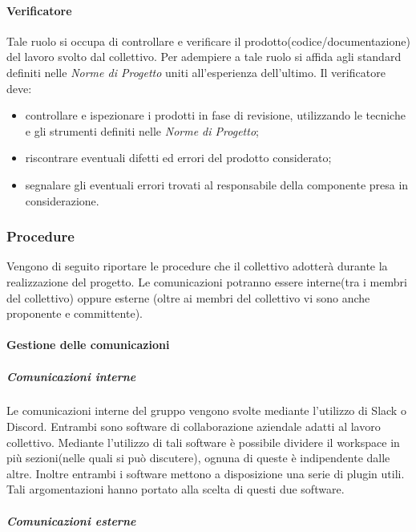 			\paragraph{Verificatore}
			Tale ruolo si occupa di controllare e verificare il prodotto(codice/documentazione) del lavoro svolto dal collettivo. Per adempiere a tale ruolo si affida agli standard definiti nelle \textit{Norme di Progetto} uniti all'esperienza dell'ultimo. Il verificatore deve:
			\begin{itemize}
				\item controllare e ispezionare i prodotti in fase di revisione, utilizzando le tecniche e gli strumenti definiti nelle \textit{Norme di Progetto};
				\item riscontrare eventuali difetti ed errori del prodotto considerato;
				\item segnalare gli eventuali errori trovati al responsabile della componente presa in considerazione.
			\end{itemize}
		
		
		\subsubsection{Procedure}
		Vengono di seguito riportare le procedure che il collettivo adotterà durante la realizzazione del progetto. Le comunicazioni potranno essere interne(tra i membri del collettivo) oppure esterne (oltre ai membri del collettivo vi sono anche proponente e committente).
		
			\paragraph{Gestione delle comunicazioni}
			
				\subparagraph{Comunicazioni interne}
				Le comunicazioni interne del gruppo vengono svolte mediante l'utilizzo di Slack o Discord. Entrambi sono software di collaborazione aziendale adatti al lavoro collettivo. Mediante l'utilizzo di tali software è possibile dividere il workspace in più sezioni(nelle quali si può discutere), ognuna di queste è indipendente dalle altre. Inoltre entrambi i software mettono a disposizione una serie di plugin utili. Tali argomentazioni hanno portato alla scelta di questi due software.
				
				\subparagraph{Comunicazioni esterne}
				
			
		
